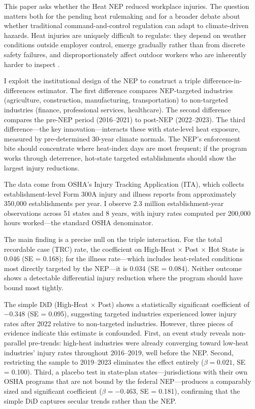 \documentclass[12pt]{article}
\begin{document}
This paper asks whether the Heat NEP reduced workplace injuries. The question matters both for the pending heat rulemaking and for a broader debate about whether traditional command-and-control regulation can adapt to climate-driven hazards. Heat injuries are uniquely difficult to regulate: they depend on weather conditions outside employer control, emerge gradually rather than from discrete safety failures, and disproportionately affect outdoor workers who are inherently harder to inspect \citep{kjellstrom2016heat, graff2014temperature}.

I exploit the institutional design of the NEP to construct a triple difference-in-differences estimator. The first difference compares NEP-targeted industries (agriculture, construction, manufacturing, transportation) to non-targeted industries (finance, professional services, healthcare). The second difference compares the pre-NEP period (2016--2021) to post-NEP (2022--2023). The third difference---the key innovation---interacts these with state-level heat exposure, measured by pre-determined 30-year climate normals. The NEP's enforcement bite should concentrate where heat-index days are most frequent; if the program works through deterrence, hot-state targeted establishments should show the largest injury reductions.

The data come from OSHA's Injury Tracking Application (ITA), which collects establishment-level Form 300A injury and illness reports from approximately 350,000 establishments per year. I observe 2.3 million establishment-year observations across 51 states and 8 years, with injury rates computed per 200,000 hours worked---the standard OSHA denominator.

The main finding is a precise null on the triple interaction. For the total recordable case (TRC) rate, the coefficient on High-Heat $\times$ Post $\times$ Hot State is 0.046 (SE = 0.168); for the illness rate---which includes heat-related conditions most directly targeted by the NEP---it is 0.034 (SE = 0.084). Neither outcome shows a detectable differential injury reduction where the program should have bound most tightly.

The simple DiD (High-Heat $\times$ Post) shows a statistically significant coefficient of $-0.348$ (SE = 0.095), suggesting targeted industries experienced lower injury rates after 2022 relative to non-targeted industries. However, three pieces of evidence indicate this estimate is confounded. First, an event study reveals non-parallel pre-trends: high-heat industries were already converging toward low-heat industries' injury rates throughout 2016--2019, well before the NEP. Second, restricting the sample to 2019--2023 eliminates the effect entirely ($\beta = 0.021$, SE = 0.100). Third, a placebo test in state-plan states---jurisdictions with their own OSHA programs that are not bound by the federal NEP---produces a comparably sized and significant coefficient ($\beta = -0.463$, SE = 0.181), confirming that the simple DiD captures secular trends rather than the NEP.
\end{document}
